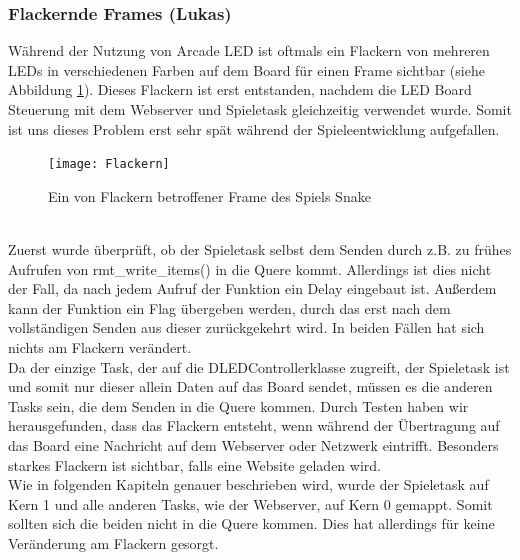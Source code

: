 \documentclass[12pt,a4paper]{article}
\begin{document}
\subsubsection{Flackernde Frames (Lukas)}
Während der Nutzung von Arcade LED ist oftmals ein Flackern von mehreren LEDs in verschiedenen Farben auf dem Board für einen Frame sichtbar (siehe Abbildung \ref{fig:Flackern}). Dieses Flackern ist erst entstanden, nachdem die LED Board Steuerung mit dem Webserver und Spieletask gleichzeitig verwendet wurde. Somit ist uns dieses Problem erst sehr spät während der Spieleentwicklung aufgefallen.
 \begin{figure}[h]
\centering
\texttt{[image: Flackern]}
\caption{\label{fig:Flackern}Ein von Flackern betroffener Frame des Spiels Snake}
\end{figure}
\vspace{1ex}\\
Zuerst wurde überprüft, ob der Spieletask selbst dem Senden durch z.B. zu frühes Aufrufen von rmt\_write\_items() in die Quere kommt. Allerdings ist dies nicht der Fall, da nach jedem Aufruf der Funktion ein Delay eingebaut ist. Außerdem kann der Funktion ein Flag übergeben werden, durch das erst nach dem vollständigen Senden aus dieser zurückgekehrt wird\cite{ESSPRESSIF:Reference}. In beiden Fällen hat sich nichts am Flackern verändert.
\vspace{1ex}\\
Da der einzige Task, der auf die DLEDControllerklasse zugreift, der Spieletask ist und somit nur dieser allein Daten auf das Board sendet, müssen es die anderen Tasks sein, die dem Senden in die Quere kommen.  Durch Testen haben wir herausgefunden, dass das Flackern entsteht, wenn während der Übertragung auf das Board eine Nachricht auf dem Webserver oder Netzwerk eintrifft. Besonders starkes Flackern ist sichtbar, falls eine Website geladen wird.
\vspace{1ex}\\ 
Wie in folgenden Kapiteln genauer beschrieben wird, wurde der Spieletask auf Kern 1 und alle anderen Tasks, wie der Webserver, auf Kern 0 gemappt. Somit sollten sich die beiden nicht in die Quere kommen. Dies hat allerdings für keine Veränderung am Flackern gesorgt.
\vspace{1ex}\\ 
\end{document}
